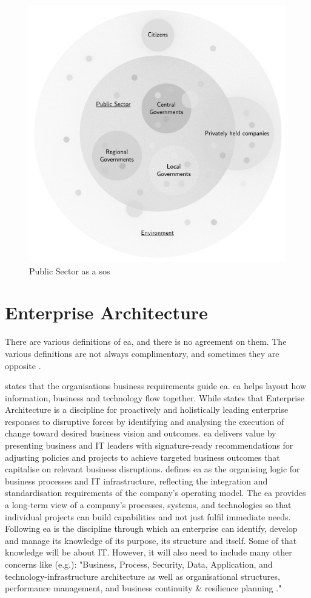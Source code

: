 \begin{figure}[H]
	\centering
	\includegraphics[width=0.5\linewidth]{images/pssystemofsystems}
	\caption[Public Sector as a \acrlong{sos}]{Public Sector as a \acrlong{sos}}
	\label{fig:pssystemofsystems}
\end{figure}

\section{Enterprise Architecture}
\label{sec:tbenterprisearchitecture}
There are various definitions of \acrlong{ea}, and there is no agreement on them. The various definitions are not always complimentary, and sometimes they are opposite \parencites{Lapalme2012}{SaintLouis2019}{Hoogervorst2009}. 

\textcite{White2018} states that the organisations business requirements guide \acrshort{ea}. \acrshort{ea} helps layout how information, business and technology flow together. While \textcite{Gartner} states that Enterprise Architecture is a discipline for proactively and holistically leading enterprise responses to disruptive forces by identifying and analysing the execution of change toward desired business vision and outcomes. \acrshort{ea} delivers value by presenting business and IT leaders with signature-ready recommendations for adjusting policies and projects to achieve targeted business outcomes that capitalise on relevant business disruptions. \textcite[p.~9]{Ross2014} defines \acrshort{ea} as the organising logic for business processes and IT infrastructure, reflecting the integration and standardisation requirements of the company's operating model. The \acrshort{ea} provides a long-term view of a company's processes, systems, and technologies so that individual projects can build capabilities and not just fulfil immediate needs. Following \textcite[p.~4]{Graves2009} \acrshort{ea} is the discipline through which an enterprise can identify, develop and manage its knowledge of its purpose, its structure and itself. Some of that knowledge will be about IT. However, it will also need to include many other concerns like (e.g.): "Business, Process, Security, Data, Application, and technology-infrastructure architecture as well as organisational structures, performance management, and  business continuity \& resilience planning \parencite[p.~4]{Graves2009}."

